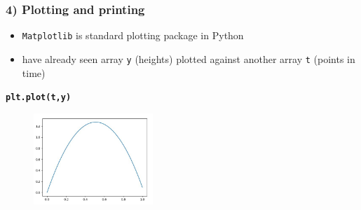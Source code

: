\documentclass[14pt]{beamer}
\newcommand\blue[1]{{\color{blue} #1}}
\begin{document}

\begin{frame}[fragile]
\frametitle{4) Plotting and printing}

\begin{itemize}
	\item \texttt{Matplotlib} is standard plotting package in Python
	\item have already seen array \texttt{y} (heights) plotted against another array \texttt{t} (points in time) 
\end{itemize}
\vspace*{-6mm}
\begin{center}
{\small\blue{
\textbf{
\texttt{plt.plot(t,y)}}}
}
\end{center}
\vspace*{-8mm}
\begin{figure}[ht]
	\centering
	\includegraphics[width=0.4\textwidth]{figures/LLp22a}
\end{figure}

\end{frame}

\end{document}
